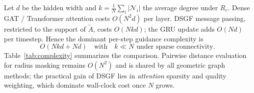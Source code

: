 Let $d$ be the hidden width and $k=\frac{1}{N}\sum_i|\mathcal{N}_i|$ the average
degree under $R_c$.
Dense GAT / Transformer attention costs $O(N^{2}d)$ per layer.
DSGF message passing, restricted to the support of $\tilde{A}$, costs
$O(Nkd)$; the GRU update adds $O(Nd)$ per timestep.
Hence the dominant per-step guidance complexity is
\begin{equation}
O(Nkd+Nd)
\quad\text{with}\quad
k\ll N
\text{ under sparse connectivity}.
\end{equation}
Table~\ref{tab:complexity} summarizes the comparison.
Pairwise distance evaluation for radius masking remains $O(N^{2})$ and is
shared by all geometric graph methods; the practical gain of DSGF lies in
\emph{attention} sparsity and quality weighting, which dominate wall-clock cost
once $N$ grows.


